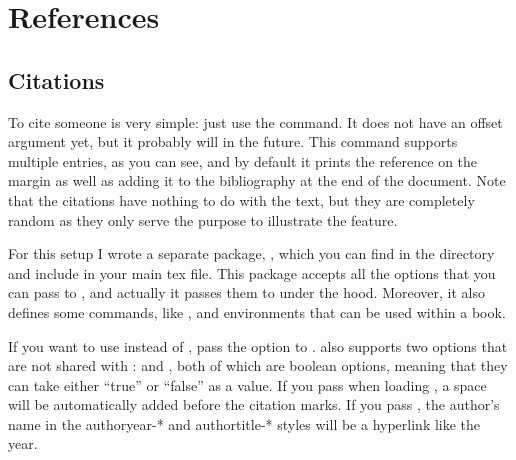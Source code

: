 \chapter{References}

\section{Citations}

To cite someone  is very simple: just 
use the  command. It does 
not have an offset argument yet, but it probably will in the future. 
This command supports multiple entries, as you can see, and by default 
it prints the reference on the margin as well as adding it to the 
bibliography at the end of the document. Note that the citations have 
nothing to do with the text, but they are completely 
random as they only serve the purpose to illustrate the feature.

For this setup I wrote a separate package, , which 
you can find in the  directory and include in your main 
tex file. This package accepts all the options that you can pass to 
, and actually it passes them to  
under the hood. Moreover, it also defines some commands, like 
, and environments that can be used within a 
 book.

If you want to use  instead of ,
pass the option  to .
 also supports two options that are not shared with
:  and ,
both of which are boolean options, meaning that they can take
either \enquote{true} or \enquote{false} as a value. If you
pass  when loading ,
a space will be automatically added before the citation marks.
If you pass , the author's name in
the authoryear-* and authortitle-* styles will be a hyperlink
like the year.

